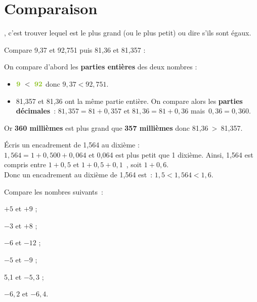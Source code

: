 
\newpage

\section{Comparaison}

\vspace{4em}

\begin{aconnaitre}
, c'est trouver lequel est le plus grand (ou le plus petit) ou dire s'ils sont égaux.
\end{aconnaitre}

\vspace{4em}

\begin{methode*1}


\begin{exemple*1}
Compare 9,37 et 92,751 puis 81,36 et 81,357 :

On compare d'abord les \textbf{\textcolor{H1}{parties entières}} des deux nombres :
\begin{itemize}
 \item $\textbf{\textcolor{H1}{9}} < \textbf{\textcolor{H1}{92}}$ donc $9,37 < 92,751$.
 \item 81,357 et 81,36 ont la même partie entière. On compare alors les \textbf{\textcolor{B2}{parties décimales}} : $81,357 = 81 + 0,357$ et $81,36 = 81 + 0,36$ mais $0,36 = 0,360$.
 \end{itemize}
Or \textbf{\textcolor{B2}{360 millièmes}} est plus grand que \textbf{\textcolor{B2}{357 millièmes}} donc 81,36 > 81,357.
\end{exemple*1}


\begin{exemple*1}
Écris un encadrement de 1,564 au dixième : \\[0.5em]
$1,564 = 1 + 0,500 + 0,064$ et 0,064 est plus petit que 1 dixième. Ainsi, 1,564 est compris entre $1 + 0,5$ et $1 + 0,5 + 0,1$ , soit $1 + 0,6$. \\[0.5em]
Donc un encadrement au dixième de 1,564 est : $1,5 < 1,564 < 1,6$.
\end{exemple*1}

\exercice
Compare les nombres suivants :
\begin{colenumerate}{3}
 \item $+ 5$ et $+ 9$ ;
 \item $- 3$ et $+ 8$ ;
 \item $- 6$ et $- 12$ ;
 \item $- 5$ et $- 9$ ;
 \item 5,1 et $- 5,3$ ;
 \item $- 6,2$ et $- 6,4$.
 \end{colenumerate}

\end{methode*1}


